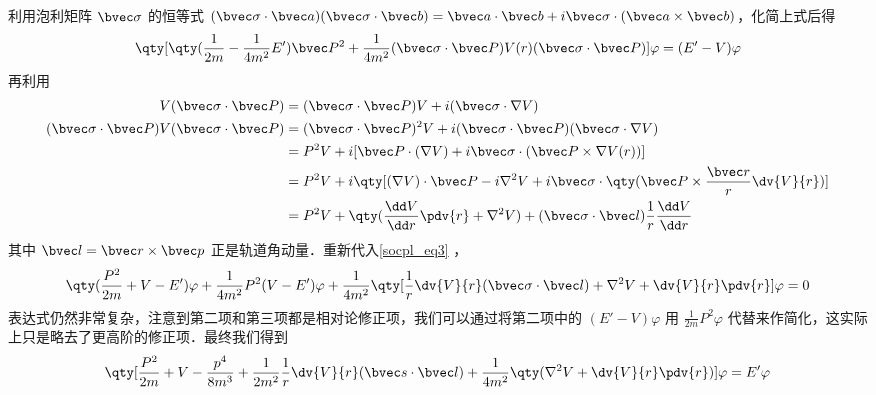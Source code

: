 利用泡利矩阵 $\bvec \sigma$ 的恒等式  $(\bvec \sigma\cdot \bvec a)(\bvec \sigma\cdot \bvec b)=\bvec a\cdot \bvec b+i\bvec \sigma\cdot (\bvec a\times \bvec b)$，化简上式后得
\begin{equation}\label{socpl_eq3}
\qty[\qty(\frac{1}{2m}-\frac{1}{4m^2}E')\bvec P^2+\frac{1}{4m^2}(\bvec \sigma\cdot \bvec P)V(r)(\bvec \sigma\cdot \bvec P)]\varphi=(E'-V)\varphi
\end{equation}
再利用
\begin{equation}
\begin{aligned}
V(\bvec \sigma\cdot \bvec P)&=(\bvec \sigma\cdot \bvec P)V+i (\bvec \sigma\cdot \nabla V)\\
(\bvec \sigma\cdot \bvec P)V(\bvec \sigma\cdot \bvec P)&=(\bvec \sigma\cdot \bvec P)^2 V+i (\bvec \sigma\cdot \bvec P)(\bvec \sigma\cdot \nabla V)\\
&=P^2 V+i [\bvec P\cdot (\nabla V)+i\bvec \sigma \cdot (\bvec P\times \nabla V(r))]\\
&=P^2V+i\qty[(\nabla V)\cdot \bvec P-i\nabla^2 V+i\bvec \sigma\cdot\qty(\bvec P\times \frac{\bvec r}{r}\dv{V}{r})]\\
&=P^2V+\qty(\frac{\dd V}{\dd r}\pdv{r} + \nabla^2 V)+(\bvec \sigma\cdot \bvec l)\frac{1}{r}\frac{\dd V}{\dd r}
\end{aligned}
\end{equation}
其中 $\bvec l=\bvec r\times \bvec p$ 正是轨道角动量．重新代入\autoref{socpl_eq3} ，
\begin{equation}
\qty(\frac{P^2}{2m}+V-E')\varphi+\frac{1}{4m^2}P^2(V-E')\varphi + \frac{1}{4m^2}\qty[\frac{1}{r}\dv{V}{r}(\bvec \sigma\cdot\bvec l)+\nabla^2 V+\dv{V}{r}\pdv{r}]\varphi = 0
\end{equation}
表达式仍然非常复杂，注意到第二项和第三项都是相对论修正项，我们可以通过将第二项中的 $(E'-V)\varphi$ 用 $\frac{1}{2m}P^2\varphi$ 代替来作简化，这实际上只是略去了更高阶的修正项．最终我们得到
\begin{equation}
\qty[\frac{P^2}{2m}+V-\frac{p^4}{8m^3}+\frac{1}{2m^2}\frac{1}{r}\dv{V}{r}(\bvec s\cdot \bvec l)+\frac{1}{4m^2}\qty(\nabla^2 V+\dv{V}{r}\pdv{r})]\varphi = E'\varphi
\end{equation}


